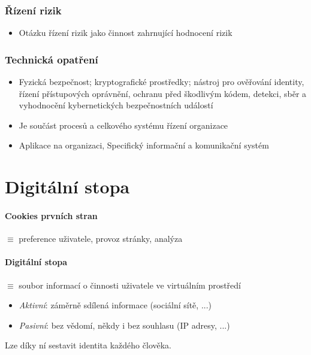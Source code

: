 \documentclass[10pt,a4paper]{article}
\begin{document}
\subsubsection*{Řízení rizik}
\begin{itemize}
    \item Otázku řízení rizik jako činnost zahrnující hodnocení rizik
\end{itemize}

\subsubsection*{Technická opatření}
\begin{itemize}
    \item Fyzická bezpečnost; kryptografické prostředky; nástroj pro ověřování identity, řízení přístupových oprávnění, ochranu před škodlivým kódem, detekci, sběr a vyhodnocění kybernetických bezpečnostních událostí
    \item Je součást procesů a celkového systému řízení organizace
    \item Aplikace na organizaci, Specifický informační a komunikační systém
\end{itemize}



\section{Digitální stopa}

\paragraph*{Cookies prvních stran} $\equiv$ preference uživatele, provoz stránky, analýza

\paragraph*{Digitální stopa} $\equiv$ soubor informací o činnosti uživatele ve virtuálním prostředí
\begin{itemize}
    \item \textit{Aktivní}: záměrně sdílená informace (sociální sítě, ...)
    \item \textit{Pasivní}:  bez vědomí, někdy i bez souhlasu (IP adresy, ...)
\end{itemize}
Lze díky ní sestavit identita každého člověka.
\end{document}
